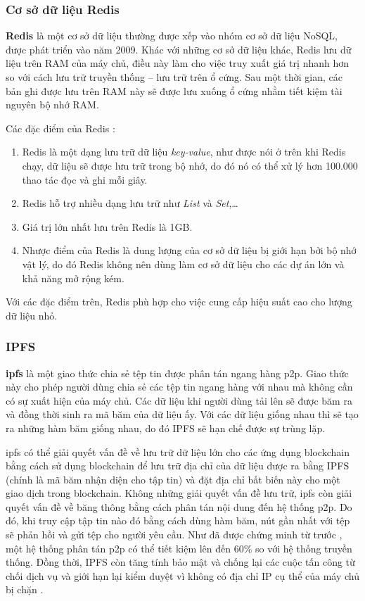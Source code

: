 \documentclass[../main-report.tex]{subfiles}
\begin{document}
\subsubsection{Cơ sở dữ liệu Redis}
\textbf{Redis} là một cơ sở dữ liệu thường được xếp vào nhóm cơ sở dữ liệu NoSQL, được phát triển vào năm 2009. Khác với những cơ sở dữ liệu khác, Redis lưu dữ liệu trên RAM của máy chủ, điều này làm cho việc truy xuất giá trị nhanh hơn so với cách lưu trữ truyền thống – lưu trữ trên ổ cứng. Sau một thời gian, các bản ghi được lưu trên RAM này sẽ được lưu xuống ổ cứng nhằm tiết kiệm tài nguyên bộ nhớ RAM.

Các đặc điểm của Redis \cite{6106531}:

\begin{enumerate}[label=(\roman*)]
\item Redis là một dạng lưu trữ dữ liệu \textit{key-value}, như được nói ở trên khi Redis chạy, dữ liệu sẽ được lưu trữ trong bộ nhớ, do đó nó có thể xử lý hơn 100.000 thao tác đọc và ghi mỗi giây.
\item Redis hỗ trợ nhiều dạng lưu trữ như \textit{List} và \textit{Set},\ldots
\item Giá trị lớn nhất lưu trên Redis là 1GB.
\item Nhược điểm của Redis là dung lượng của cơ sở dữ liệu bị giới hạn bởi bộ nhớ vật lý, do đó Redis không nên dùng làm cơ sở dữ liệu cho các dự án lớn và khả năng mở rộng kém.
\end{enumerate}

Với các đặc điểm trên, Redis phù hợp cho việc cung cấp hiệu suất cao cho lượng dữ liệu nhỏ.

\subsubsection{IPFS}
\textbf{\acrfull{ipfs}} là một giao thức chia sẻ tệp tin được phân tán ngang hàng \acrfull{p2p}. Giao thức này cho phép người dùng chia sẻ các tệp tin ngang hàng với nhau mà không cần có sự xuất hiện của máy chủ. Các dữ liệu khi người dùng tải lên sẽ được băm ra và đồng thời sinh ra mã băm của dữ liệu ấy. Với các dữ liệu giống nhau thì sẽ tạo ra những hàm băm giống nhau, do đó IPFS sẽ hạn chế được sự trùng lặp.
 
\acrshort{ipfs} có thể giải quyết vấn đề về lưu trữ dữ liệu lớn cho các ứng dụng \gls{blockchain} bằng cách sử dụng blockchain để lưu trữ địa chỉ của dữ liệu được ra bằng IPFS (chính là mã băm nhận diện cho tập tin) và đặt địa chỉ bất biến này cho một giao dịch trong blockchain. Không những giải quyết vấn đề lưu trữ, \acrshort{ipfs} còn giải quyết vấn đề về băng thông bằng cách phân tán nội dung đến hệ thống \acrshort{p2p}. Do đó, khi truy cập tập tin nào đó bằng cách dùng hàm băm, nút gần nhất với tệp sẽ phản hồi và gửi tệp cho người yêu cầu. Như đã được chứng minh từ trước \cite{5235364}, một hệ thống phân tán \acrshort{p2p} có thể tiết kiệm lên đến 60\% so với hệ thống truyền thống. Đồng thời, IPFS còn tăng tính bảo mật và chống lại các cuộc tấn công từ chối dịch vụ và giới hạn lại kiểm duyệt vì không có địa chỉ IP cụ thể của máy chủ bị chặn \cite{8441990}.
\end{document}
